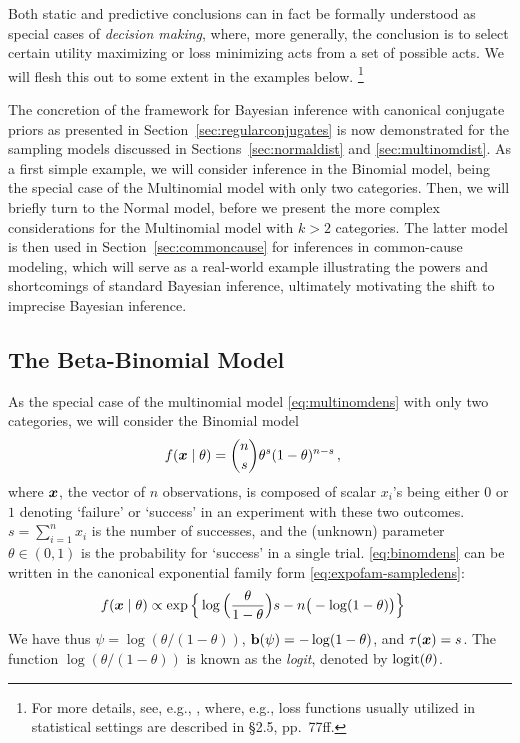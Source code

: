 Both static and predictive conclusions can in fact be formally understood as special cases of \emph{decision making},
where, more generally, the conclusion is to select certain utility maximizing or loss minimizing acts from a set of possible acts.
We will flesh this out to some extent in the examples below.%
\footnote{For more details, see, e.g., \textcite[\S 2]{2007:robert},
where, e.g., loss functions usually utilized in statistical settings are described in \S 2.5, pp.~77ff.}

\medskip

The concretion of the framework for Bayesian inference with canonical conjugate priors
as presented in Section~\ref{sec:regularconjugates}
is now demonstrated for the sampling models discussed in Sections~\ref{sec:normaldist} and \ref{sec:multinomdist}.
As a first simple example, we will consider inference in the Binomial model,
being the special case of the Multinomial model with only two categories.
Then, we will briefly turn to the Normal model,
before we present the more complex considerations for the Multinomial model with $k>2$ categories.
The latter model %
is then used in Section~\ref{sec:commoncause} for inferences in common-cause modeling,
which will serve as a real-world example illustrating the powers and shortcomings of standard Bayesian inference,
ultimately motivating the shift to imprecise Bayesian inference.


\subsection{The Beta-Binomial Model}
\label{sec:beta-binom}

As the special case of the multinomial model \eqref{eq:multinomdens} with only two categories, we will consider the Binomial model
\begin{align}
\label{eq:binomdens}
f({\bm x}\mid\theta) &= {n \choose s}\theta^s (1-\theta)^{n-s}\,,
\end{align}
where ${\bm x}$, the vector of $n$ observations, is composed of scalar $x_i$'s being either $0$ or $1$
denoting `failure' or `success' in an experiment with these two outcomes.
$s = \sum_{i=1}^n x_i$ is the number of successes,
and the (unknown) parameter $\theta \in (0,1)$ is the probability for `success' in a single trial.
\eqref{eq:binomdens} can be written in the canonical exponential family form \eqref{eq:expofam-sampledens}:
\begin{align*}
f({\bm x}\mid\theta) &\propto \exp\Big\{ \log\Big(\frac{\theta}{1-\theta}\Big) s - n \big(-\log(1-\theta)\big) \Big\}
\end{align*}
We have thus $\psi = \log(\theta/(1-\theta))$, $\mathbf{b}(\psi) = -\log(1-\theta)$, and $\tau({\bm x}) = s$.
The function $\log(\theta/(1-\theta))$ is known as the \emph{logit}, denoted by $\operatorname{logit}(\theta)$.

